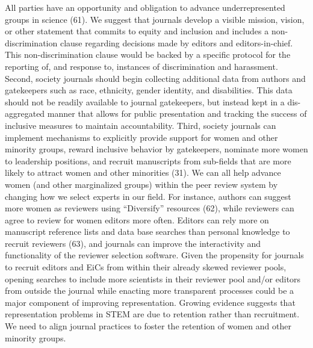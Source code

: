 \documentclass[11pt,]{article}
\begin{document}
All parties have an opportunity and obligation to advance
underrepresented groups in science (61). We suggest that journals
develop a visible mission, vision, or other statement that commits to
equity and inclusion and includes a non-discrimination clause regarding
decisions made by editors and editors-in-chief. This non-discrimination
clause would be backed by a specific protocol for the reporting of, and
response to, instances of discrimination and harassment. Second, society
journals should begin collecting additional data from authors and
gatekeepers such as race, ethnicity, gender identity, and disabilities.
This data should not be readily available to journal gatekeepers, but
instead kept in a dis-aggregated manner that allows for public
presentation and tracking the success of inclusive measures to maintain
accountability. Third, society journals can implement mechanisms to
explicitly provide support for women and other minority groups, reward
inclusive behavior by gatekeepers, nominate more women to leadership
positions, and recruit manuscripts from sub-fields that are more likely
to attract women and other minorities (31). We can all help advance
women (and other marginalized groups) within the peer review system by
changing how we select experts in our field. For instance, authors can
suggest more women as reviewers using ``Diversify'' resources (62),
while reviewers can agree to review for women editors more often.
Editors can rely more on manuscript reference lists and data base
searches than personal knowledge to recruit reviewers (63), and journals
can improve the interactivity and functionality of the reviewer
selection software. Given the propensity for journals to recruit editors
and EiCs from within their already skewed reviewer pools, opening
searches to include more scientists in their reviewer pool and/or
editors from outside the journal while enacting more transparent
processes could be a major component of improving representation.
Growing evidence suggests that representation problems in STEM are due
to retention rather than recruitment. We need to align journal practices
to foster the retention of women and other minority groups.
\end{document}
